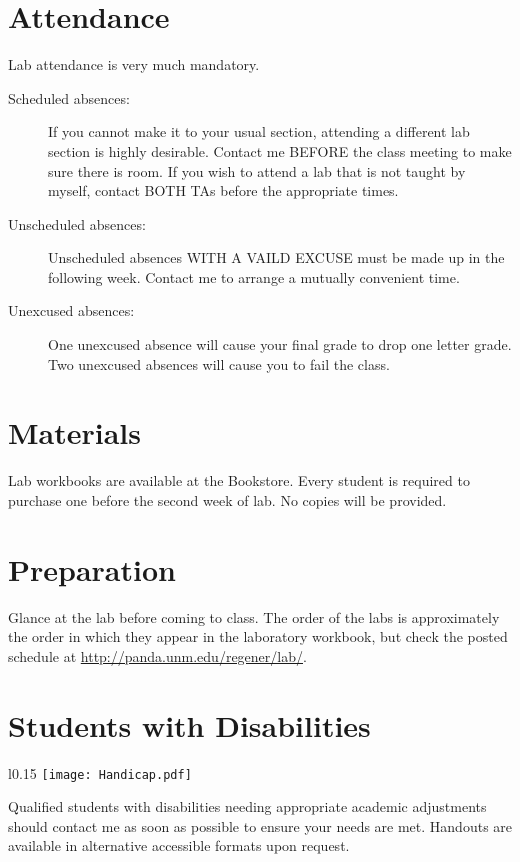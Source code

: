 \documentclass{article}
\begin{document}
\section*{Attendance}
Lab attendance is very much mandatory.
\begin{description}
\item[Scheduled absences:] If you cannot make it to your usual section,
attending a different lab section is highly desirable.  Contact me BEFORE the
class meeting to make sure there is room.  If you wish to attend a lab that is
not taught by myself, contact BOTH TAs before the appropriate times.
\item[Unscheduled absences:] Unscheduled absences WITH A VAILD EXCUSE must be
made up in the following week. Contact me to arrange a mutually convenient
time.
\item[Unexcused absences:] One unexcused absence will cause your final grade to
drop one letter grade.  Two unexcused absences will cause you to fail the
class.
\end{description}

\section*{Materials}
Lab workbooks are available at the Bookstore.  Every student is required to
purchase one before the second week of lab. No copies will be provided.

\section*{Preparation}
Glance at the lab before coming to class. The order of the labs is
approximately the order in which they appear in the laboratory workbook, but
check the posted schedule at \url{http://panda.unm.edu/regener/lab/}.

\section*{Students with Disabilities}
\begin{wrapfigure}[4]{l}{0.15\textwidth}
  \vspace{-0.04\textwidth}
  \centering
  \texttt{[image: Handicap.pdf]}
\end{wrapfigure}
Qualified students with disabilities needing appropriate academic adjustments
should contact me as soon as possible to ensure your needs are met. Handouts
are available in alternative accessible formats upon request.
\end{document}
